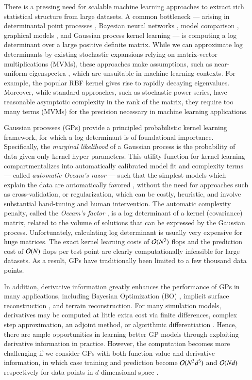 There is a pressing need for scalable machine learning approaches to extract
rich statistical structure from large datasets. A common bottleneck --- arising
in determinantal point processes \cite{kulesza2012determinantal}, Bayesian
neural networks \cite{mackay1992bayesian}, model comparison 
\cite{mackay2003information}, graphical models \cite{rue2005gaussian}, and
Gaussian process kernel learning \cite{rasmussen06} --- is computing a log
determinant over a large positive definite matrix. While we can approximate log
determinants by existing stochastic expansions relying on matrix\hyp{}vector
multiplications (MVMs), these approaches make assumptions, such as
near\hyp{}uniform eigenspectra \cite{boutsidis2015randomized}, which are
unsuitable in machine learning contexts. For example, the popular RBF kernel
gives rise to rapidly decaying eigenvalues. Moreover, while standard approaches,
such as stochastic power series, have reasonable asymptotic complexity in the
rank of the matrix, they require too many terms (MVMs) for the precision
necessary in machine learning applications.

Gaussian processes (GPs) provide a principled probabilistic kernel learning
framework, for which a log determinant is of foundational importance.
Specifically, the \emph{marginal likelihood} of a Gaussian process is the
probability of data given only kernel hyper\hyp{}parameters. This utility
function for kernel learning compartmentalizes into automatically calibrated
model fit and complexity terms --- called \emph{automatic Occam's razor} ---
such that the simplest models which explain the data are automatically favored 
\cite{rasmussen01, rasmussen06}, without the need for approaches such as
cross\hyp{}validation, or regularization, which can be costly, heuristic, and
involve substantial hand\hyp{}tuning and human intervention. The automatic
complexity penalty, called the \emph{Occam's factor} 
\cite{mackay2003information}, is a log determinant of a kernel (covariance)
matrix, related to the volume of solutions that can be expressed by the Gaussian
process. Unfortunately, calculating log determinant is usually very expensive
for huge matrices. The exact kernel learning costs of $\mathcal{O} (N^3)$ flops and
the prediction cost of $\mathcal{O}(N)$ flops per test point are clearly
computationally infeasible for large datasets. As a result, GPs have
traditionally been limited to a few thousand data points.

In addition, derivative information greatly enhances the performance of GPs in
many applications, including Bayesian Optimization (BO) \citep{wu2017bayesian},
implicit surface reconstruction \citep{macedo2011hermite}, and terrain
reconstruction.  For many simulation models, derivatives may be computed at
little extra cost via finite differences, complex step approximation, an adjoint
method, or algorithmic differentiation \citep{forrester2008engineering}. Hence,
there are ample opportunities in learning better GP models through exploiting
derivative information in practice. However, the computation becomes more
challenging if we consider GPs with both function value and derivative
information, in which case training and prediction become $\mathcal{O}(N^3d^3)$ and
$\mathcal{O}(Nd)$ respectively for data points in $d$\hyp{}dimensional space
\citep[\S9.4]{rasmussen06}.

